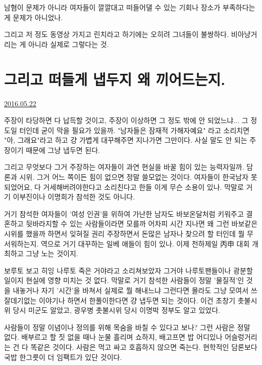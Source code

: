 남혐이 문제가 아니라 여자들이 깔깔대고 떠들어댈 수 있는 기회나 장소가 부족하다는 게 문제가 아니었나.
\vspace{5mm}

그리고 저 정도 동영상 가지고 린치라고 하기에는 오히려 그녀들이 불쌍하다. 비아냥거리는 게 아니라 실제로 그렇다는 것.
\vspace{5mm}






\section{그리고 떠들게 냅두지 왜 끼어드는지.}
\href{https://www.kockoc.com/Apoc/786879}{2016.05.22}

\vspace{5mm}

주장이 타당하면 다 납득할 것이고, 주장이 이상하면 그 정도 밖에 안 되었느냐... 그 정도일 터인데 굳이 막을 필요가 있을까.
"남자들은 잠재적 가해자예요"
라고 소리치면 "아, 그래요"라고 하고 걍 가볍게 대꾸해주면 지나가면 그만이다.
사실 말도 안 되는 주장이기 때문에 그냥 냅두면 된다.
\vspace{5mm}

그리고 무엇보다 그거 주장하는 여자들이 과연 현실을 바꿀 힘이 있는 능력자일까.
담론과 시위. 그거 어느 쪽이든  힘이 없으면 정말 쓸모없는 것이다.
여자들이 한국남자 못 되었어요, 다 거세해버려야한다고 소리친다고 한들 이게 무슨 소용이 있나.
막말로 거기 이부진이나 이명희가 참석한 것도 아니다.
\vspace{5mm}

거기 참석한 여자들이 '여성 인권'을 위하여 가난한 남자도 바보온달처럼 키워주고 결혼하고 뒷바라지할 수 있는 사람들이라면 모를까
어차피 시간 지나면 왜 그런 바보같은 시위를 했을까 하면서 잊혀질 권리 주장하면서 돈많은 남자나 찾으려 할 터인데 뭘 무서워하는지.
역으로 거기 대꾸하는 일베 애들이 힘이 있나.
이제 천하제일 丙申 대회 개최하고 그냥 노는 것이지.
\vspace{5mm}

보루토 보고 히잉 나루토 죽은 거야라고 소리쳐보았자 그거야 나루토팬들이나 광분할 일이지 현실에 영향 미치는 것 없다.
막말로 거기 참석한 사람들이 정말 '물질적'인 것을 내놓거나 자기 '시간'을 바쳐서 실제로 뭘 해내느냐 그런다면 몰라도
그냥 모여서 쓰잘데기없는 이야기나 하면서 한풀이한다면 걍 냅두면 되는 것이다.
이건 초창기 촛불시위 당시 미군도 알았고, 광우병 촛불시위 당시 이명박 정부도 알고 있었다.
\vspace{5mm}

사람들이 정말 이념이나 정의를 위해 목숨을 바칠 수 있다고 보나?
그런 사람은 정말 없다. 배부르고 할 짓 없을 때나 눈물 흘리며 쇼하지, 배고프면 밥 어디있나 어슬렁거리는 건 다 똑같은 것이다.
사람은 먹고 싸고 호흡하지 않으면 죽는다. 현학적인 담론보다 국밥 한그릇이 더 임팩트가 있단 것이다.
\vspace{5mm}

